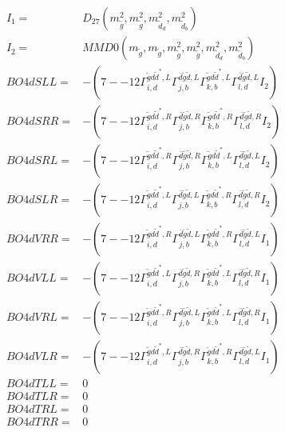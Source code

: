 \documentclass[A4,landscape]{article}
\begin{document}
\begin{align} 
I_1 = & D_{27}(m^2_{\tilde{g}}, m^2_{\tilde{g}}, m^2_{\tilde{d}_{{d}}}, m^2_{\tilde{d}_{{b}}}) \\ 
I_2 = & MMD0(m_{\tilde{g}}, m_{\tilde{g}}, m^2_{\tilde{g}}, m^2_{\tilde{g}}, m^2_{\tilde{d}_{{d}}}, m^2_{\tilde{d}_{{b}}}) \\ 
  BO4dSLL= & -(7
--
12 \Gamma^{\tilde{g} d \tilde{d}^*,L}_{i, d} \Gamma^{\bar{d}\tilde{g} \tilde{d} ,L}_{j, b} \Gamma^{\tilde{g} d \tilde{d}^*,L}_{k, b} \Gamma^{\bar{d}\tilde{g} \tilde{d} ,L}_{l, d} I_2) \\ 
  BO4dSRR= & -(7
--
12 \Gamma^{\tilde{g} d \tilde{d}^*,R}_{i, d} \Gamma^{\bar{d}\tilde{g} \tilde{d} ,R}_{j, b} \Gamma^{\tilde{g} d \tilde{d}^*,R}_{k, b} \Gamma^{\bar{d}\tilde{g} \tilde{d} ,R}_{l, d} I_2) \\ 
  BO4dSRL= & -(7
--
12 \Gamma^{\tilde{g} d \tilde{d}^*,R}_{i, d} \Gamma^{\bar{d}\tilde{g} \tilde{d} ,R}_{j, b} \Gamma^{\tilde{g} d \tilde{d}^*,L}_{k, b} \Gamma^{\bar{d}\tilde{g} \tilde{d} ,L}_{l, d} I_2) \\ 
  BO4dSLR= & -(7
--
12 \Gamma^{\tilde{g} d \tilde{d}^*,L}_{i, d} \Gamma^{\bar{d}\tilde{g} \tilde{d} ,L}_{j, b} \Gamma^{\tilde{g} d \tilde{d}^*,R}_{k, b} \Gamma^{\bar{d}\tilde{g} \tilde{d} ,R}_{l, d} I_2) \\ 
  BO4dVRR= & -(7
--
12 \Gamma^{\tilde{g} d \tilde{d}^*,R}_{i, d} \Gamma^{\bar{d}\tilde{g} \tilde{d} ,L}_{j, b} \Gamma^{\tilde{g} d \tilde{d}^*,R}_{k, b} \Gamma^{\bar{d}\tilde{g} \tilde{d} ,L}_{l, d} I_1) \\ 
  BO4dVLL= & -(7
--
12 \Gamma^{\tilde{g} d \tilde{d}^*,L}_{i, d} \Gamma^{\bar{d}\tilde{g} \tilde{d} ,R}_{j, b} \Gamma^{\tilde{g} d \tilde{d}^*,L}_{k, b} \Gamma^{\bar{d}\tilde{g} \tilde{d} ,R}_{l, d} I_1) \\ 
  BO4dVRL= & -(7
--
12 \Gamma^{\tilde{g} d \tilde{d}^*,R}_{i, d} \Gamma^{\bar{d}\tilde{g} \tilde{d} ,L}_{j, b} \Gamma^{\tilde{g} d \tilde{d}^*,L}_{k, b} \Gamma^{\bar{d}\tilde{g} \tilde{d} ,R}_{l, d} I_1) \\ 
  BO4dVLR= & -(7
--
12 \Gamma^{\tilde{g} d \tilde{d}^*,L}_{i, d} \Gamma^{\bar{d}\tilde{g} \tilde{d} ,R}_{j, b} \Gamma^{\tilde{g} d \tilde{d}^*,R}_{k, b} \Gamma^{\bar{d}\tilde{g} \tilde{d} ,L}_{l, d} I_1) \\ 
  BO4dTLL= & 0 \\ 
  BO4dTLR= & 0 \\ 
  BO4dTRL= & 0 \\ 
  BO4dTRR= & 0 \\ 
\end{align} 
\end{document}
